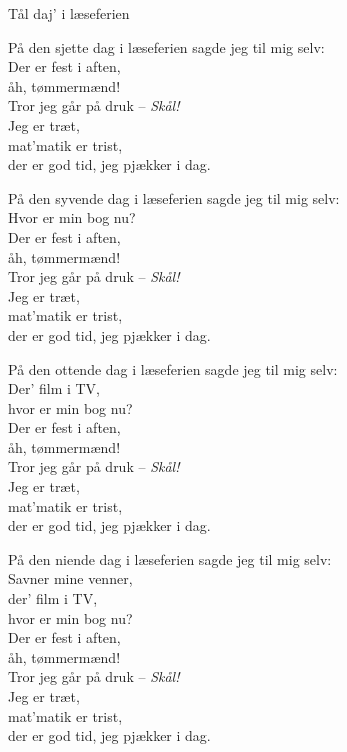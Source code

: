 \begin{song}{Tål daj' i læseferien}
  \begin{SBVerse}
    På den sjette dag i læseferien sagde jeg til mig selv:\\
    Der er fest i aften,\\
    åh, tømmermænd!\\
    Tror jeg går på druk -- \emph{Skål!}\\
    Jeg er træt,\\
    mat’matik er trist,\\
    der er god tid, jeg pjækker i dag.
  \end{SBVerse}

  \begin{SBVerse}
    På den syvende dag i læseferien sagde jeg til mig selv:\\
    Hvor er min bog nu?\\
    Der er fest i aften,\\
    åh, tømmermænd!\\
    Tror jeg går på druk -- \emph{Skål!}\\
    Jeg er træt,\\
    mat’matik er trist,\\
    der er god tid, jeg pjækker i dag.
  \end{SBVerse}

  \begin{SBVerse}
    På den ottende dag i læseferien sagde jeg til mig selv:\\
    Der' film i TV,\\
    hvor er min bog nu?\\
    Der er fest i aften,\\
    åh, tømmermænd!\\
    Tror jeg går på druk -- \emph{Skål!}\\
    Jeg er træt,\\
    mat’matik er trist,\\
    der er god tid, jeg pjækker i dag.
  \end{SBVerse}

  \begin{SBVerse}
    På den niende dag i læseferien sagde jeg til mig selv:\\
    Savner mine venner,\\
    der' film i TV,\\
    hvor er min bog nu?\\
    Der er fest i aften,\\
    åh, tømmermænd!\\
    Tror jeg går på druk -- \emph{Skål!}\\
    Jeg er træt,\\
    mat’matik er trist,\\
    der er god tid, jeg pjækker i dag.
  \end{SBVerse}


\end{song}
